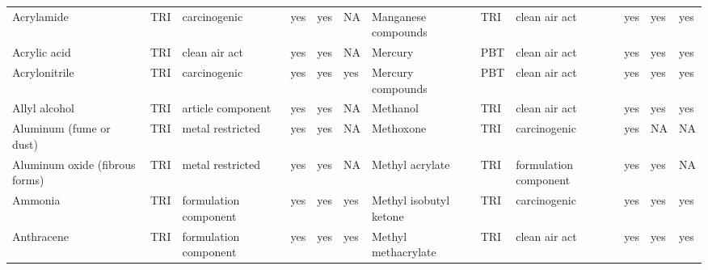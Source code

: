 \begin{table}[H]
{\begin{tabular}{llllllllllll}
            Acrylamide                                                                 & TRI            & carcinogenic          & yes    & yes     & NA   & Manganese compounds                                                                                                & TRI            & clean air act         & yes & yes & yes\\
            Acrylic acid                                                               & TRI            & clean air act         & yes    & yes     & NA   & Mercury                                                                                                            & PBT            & clean air act         & yes    & yes     & yes  \\
            Acrylonitrile                                                              & TRI            & carcinogenic          & yes    & yes     & yes  & Mercury compounds                                                                                                  & PBT            & clean air act         & yes & yes & yes\\
            Allyl alcohol                                                              & TRI            & article component     & yes    & yes     & NA   & Methanol                                                                                                           & TRI            & clean air act         & yes    & yes & yes\\
            Aluminum (fume or dust)                                                    & TRI            & metal restricted      & yes    & yes     & NA   & Methoxone                                                                                                          & TRI            & carcinogenic & yes & NA & NA\\
            Aluminum oxide (fibrous forms)                                             & TRI            & metal restricted      & yes    & yes     & NA   & Methyl acrylate                                                                                                    & TRI & formulation component & yes & yes & NA\\
            Ammonia                                                                    & TRI            & formulation component & yes    & yes     & yes  & Methyl isobutyl ketone                                                                                             & TRI            & carcinogenic & yes & yes & yes\\
            Anthracene                                                                 & TRI            & formulation component & yes    & yes     & yes  & Methyl methacrylate                                                                                                & TRI            & clean air act & yes & yes & yes\\

\end{tabular}}
\end{table}
